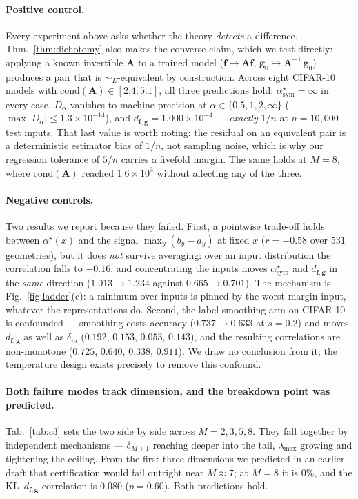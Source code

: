 \documentclass[10pt,letterpaper,twocolumn]{article}
\newcommand{\bff}{\mathbf{f}}
\newcommand{\bfg}{\mathbf{g}}
\newcommand{\dfg}{d_{\bff,\bfg}}
\newcommand{\Dalpha}{D_{\alpha}}
\newcommand{\simL}{\sim_{L}}
\theoremstyle{plain}
\theoremstyle{definition}
\theoremstyle{remark}
\begin{document}
\paragraph{Positive control.}
Every experiment above asks whether the theory \emph{detects} a difference.
Thm.~\ref{thm:dichotomy} also makes the converse claim, which we test directly:
applying a known invertible $\mathbf{A}$ to a trained model
($\bff\mapsto\mathbf{A}\bff$, $\bfg_{0}\mapsto\mathbf{A}^{-\top}\bfg_{0}$)
produces a pair that is $\simL$-equivalent by construction. Across eight
CIFAR-10 models with $\mathrm{cond}(\mathbf{A})\in[2.4,5.1]$, all three
predictions hold: $\alpha^{\star}_{\mathrm{sym}}=\infty$ in every case,
$\Dalpha$ vanishes to machine precision at $\alpha\in\{0.5,1,2,\infty\}$
($\max|\Dalpha|\le1.3\times10^{-14}$), and $\dfg=1.000\times10^{-4}$ ---
\emph{exactly} $1/n$ at $n=10{,}000$ test inputs. That last value is worth
noting: the residual on an equivalent pair is a deterministic estimator bias of
$1/n$, not sampling noise, which is why our regression tolerance of $5/n$
carries a fivefold margin. The same holds at $M{=}8$, where
$\mathrm{cond}(\mathbf{A})$ reached $1.6\times10^{3}$ without affecting any of
the three.

\paragraph{Negative controls.}
Two results we report because they failed. First, a pointwise trade-off holds
between $\alpha^{\star}(x)$ and the signal $\max_{y}(b_{y}-a_{y})$ at fixed $x$
($r=-0.58$ over $531$ geometries), but it does \emph{not} survive averaging:
over an input distribution the correlation falls to $-0.16$, and concentrating
the inputs moves $\alpha^{\star}_{\mathrm{sym}}$ and $\dfg$ in the \emph{same}
direction ($1.013\to1.234$ against $0.665\to0.701$). The mechanism is
Fig.~\ref{fig:ladder}(c): a minimum over inputs is pinned by the worst-margin
input, whatever the representations do. Second, the label-smoothing arm on
CIFAR-10 is confounded --- smoothing costs accuracy ($0.737\to0.633$ at
$s=0.2$) and moves $\dfg$ as well as $\delta_{m}$ ($0.192$, $0.153$, $0.053$,
$0.143$), and the resulting correlations are non-monotone ($0.725$, $0.640$,
$0.338$, $0.911$). We draw no conclusion from it; the temperature design exists
precisely to remove this confound.

\paragraph{Both failure modes track dimension, and the breakdown point was
predicted.}
Tab.~\ref{tab:c3} sets the two side by side across $M=2,3,5,8$. They fall
together by independent mechanisms --- $\delta_{M+1}$ reaching deeper into the
tail, $\lambda_{\max}$ growing and tightening the ceiling. From the first three
dimensions we predicted in an earlier draft that certification would fail
outright near $M\approx7$; at $M{=}8$ it is $0\%$, and the KL--$\dfg$
correlation is $0.080$ ($p=0.60$). Both predictions hold.
\end{document}
